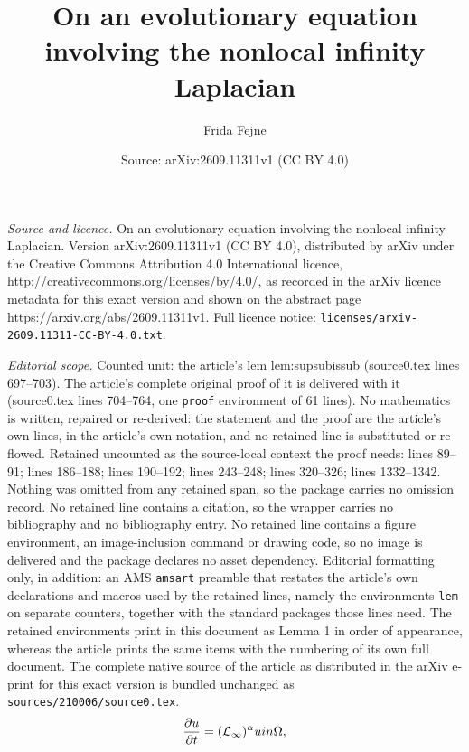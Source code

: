 \documentclass[10pt,a4paper]{amsart}
\title{On an evolutionary equation involving the nonlocal infinity Laplacian}
\author{Frida Fejne}
\date{Source: arXiv:2609.11311v1 (CC BY 4.0)}
\begin{document}
\maketitle

\noindent\emph{Source and licence.} On an evolutionary equation involving the nonlocal infinity Laplacian. Version arXiv:2609.11311v1 (CC BY 4.0), distributed by arXiv under the Creative Commons Attribution 4.0 International licence, http://creativecommons.org/licenses/by/4.0/, as recorded in the arXiv licence metadata for this exact version and shown on the abstract page https://arxiv.org/abs/2609.11311v1. Full licence notice: \texttt{licenses/arxiv-2609.11311-CC-BY-4.0.txt}.\par\smallskip

\noindent\textit{Editorial scope.} Counted unit: the article's lem lem:supsubissub (source0.tex lines 697--703). The article's complete original proof of it is delivered with it (source0.tex lines 704--764, one \texttt{proof} environment of 61 lines). No mathematics is written, repaired or re-derived: the statement and the proof are the article's own lines, in the article's own notation, and no retained line is substituted or re-flowed.  Retained uncounted as the source-local context the proof needs: lines 89--91; lines 186--188; lines 190--192; lines 243--248; lines 320--326; lines 1332--1342.  Nothing was omitted from any retained span, so the package carries no omission record.  No retained line contains a citation, so the wrapper carries no bibliography and no bibliography entry.  No retained line contains a figure environment, an image-inclusion command or drawing code, so no image is delivered and the package declares no asset dependency.  Editorial formatting only, in addition: an AMS \texttt{amsart} preamble that restates the article's own declarations and macros used by the retained lines, namely the environments \texttt{lem} on separate counters, together with the standard packages those lines need.  The retained environments print in this document as Lemma 1 in order of appearance, whereas the article prints the same items with the numbering of its own full document.  The complete native source of the article as distributed in the arXiv e-print for this exact version is bundled unchanged as \texttt{sources/210006/source0.tex}.
\begin{align} \label{eq:Luf} 
 \frac{\partial u}{\partial t} = (\mathcal{L}_{\infty})^{\alpha}u   \textup{ in }  \Omega,
\end{align}
\end{document}
